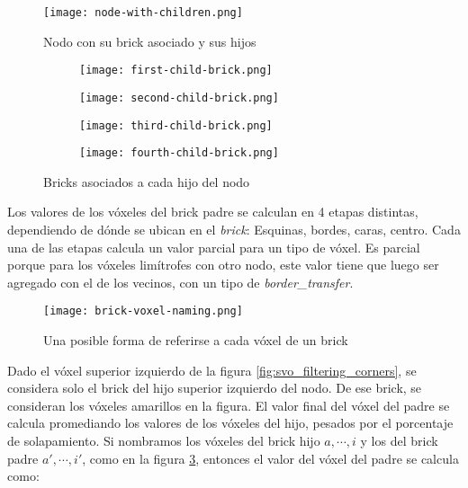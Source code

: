 \begin{figure}[h!]
    \centering
    \texttt{[image: node-with-children.png]}
    \caption{Nodo con su brick asociado y sus hijos}
    \label{fig:node_with_children}
\end{figure}

\begin{figure}[h!]
    \begin{center}
        \begin{subfigure}{.24\textwidth}
            \texttt{[image: first-child-brick.png]}
        \end{subfigure}
        \begin{subfigure}{.24\textwidth}
            \texttt{[image: second-child-brick.png]}
        \end{subfigure}
        \begin{subfigure}{.24\textwidth}
            \texttt{[image: third-child-brick.png]}
        \end{subfigure}
        \begin{subfigure}{.24\textwidth}
            \texttt{[image: fourth-child-brick.png]}
        \end{subfigure}
    \end{center}
    \caption{Bricks asociados a cada hijo del nodo}
    \label{fig:all_child_bricks}
\end{figure}

Los valores de los vóxeles del brick padre se calculan en 4 etapas distintas, dependiendo de dónde se ubican en el \textit{brick}: Esquinas, bordes, caras, centro.
Cada una de las etapas calcula un valor parcial para un tipo de vóxel.
Es parcial porque para los vóxeles limítrofes con otro nodo, este valor tiene que luego ser agregado con el de los vecinos, con un tipo de \textit{border\_transfer}.


\begin{figure}
    \centering
    \texttt{[image: brick-voxel-naming.png]}
    \caption{Una posible forma de referirse a cada vóxel de un brick}
    \label{fig:brick-voxel-naming}
\end{figure}

Dado el vóxel superior izquierdo de la figura \ref{fig:svo_filtering_corners}, se considera solo el brick del hijo superior izquierdo del nodo.
De ese brick, se consideran los vóxeles amarillos en la figura.
El valor final del vóxel del padre se calcula promediando los valores de los vóxeles del hijo, pesados por el porcentaje de solapamiento.
Si nombramos los vóxeles del brick hijo $a, \cdots, i$ y los del brick padre $a', \cdots, i'$, como en la figura \ref{fig:brick-voxel-naming}, entonces el valor del vóxel del padre se calcula como:

